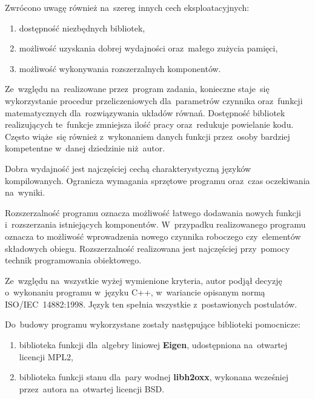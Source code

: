Zwrócono uwagę również na~szereg innych cech eksploatacyjnych:

\begin{enumerate}

	\item dostępność niezbędnych bibliotek,

	\item możliwość uzyskania dobrej wydajności oraz~małego zużycia
	pamięci,

	\item możliwość wykonywania rozszerzalnych komponentów.

\end{enumerate}

Ze~względu na~realizowane przez~program zadania, konieczne staje~się
wykorzystanie procedur przeliczeniowych dla~parametrów czynnika
oraz~funkcji matematycznych dla~rozwiązywania układów równań. Dostępność
bibliotek realizujących te~funkcje zmniejsza ilość pracy oraz~redukuje
powielanie kodu. Często wiąże~się również z~wykonaniem danych funkcji
przez~osoby bardziej kompetentne w~danej dziedzinie niż~autor.

Dobra wydajność jest najczęściej cechą charakterystyczną języków
kompilowanych. Ogranicza wymagania sprzętowe programu oraz~czas
oczekiwania na~wyniki.

Rozszerzalność programu oznacza możliwość łatwego dodawania nowych
funkcji i~rozszerzania istniejących komponentów. W~przypadku
realizowanego programu oznacza to możliwość wprowadzenia nowego czynnika
roboczego czy~elementów składowych obiegu. Rozszerzalność realizowana
jest najczęściej przy~pomocy technik programowania obiektowego.

Ze~względu na~wszystkie wyżej wymienione kryteria, autor podjął decyzję
o~wykonaniu programu w~języku C++, w~wariancie opisanym normą
ISO/IEC~14882:1998. Język ten spełnia wszystkie z~postawionych
postulatów.

Do~budowy programu wykorzystane zostały następujące biblioteki
pomocnicze:

\begin{enumerate}

	\item biblioteka funkcji dla~algebry liniowej \textbf{Eigen}, udostępniona
		na~otwartej licencji MPL2,

	\item biblioteka funkcji stanu dla~pary wodnej \textbf{libh2oxx},
		wykonana wcześniej przez~autora na~otwartej licencji BSD.

\end{enumerate}



